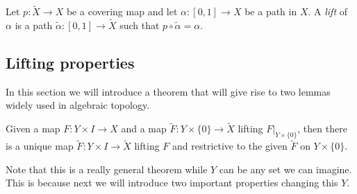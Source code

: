 \documentclass[12pt]{article}
\begin{document}
\begin{definition}
	Let \(p: \tilde{X} \rightarrow X\) be a covering map and let \(\alpha: [0,1] \rightarrow X\) be a path in \(X\). A \textit{lift} of \(\alpha\) is a path \(\tilde{\alpha}: [0,1] \rightarrow \tilde{X}\) such that \(p \circ \tilde{\alpha} = \alpha\).
\end{definition}

\subsection{Lifting properties}

In this section we will introduce a theorem that will give rise to two lemmas widely used in algebraic topology.

\begin{theorem}
	Given a map \(F : Y \times I \rightarrow X\) and a map \(\tilde{F} : Y \times \{0\} \rightarrow \tilde{X}\) lifting \(F|_{Y \times \{0\}}\), then there is a unique map \(\tilde{F} : Y \times I \rightarrow \tilde{X}\) lifting \(F\) and restrictive to the given \(\tilde{F}\) on \(Y \times \{0\}\). 
	\label{lemma:lift}
\end{theorem}

Note that this is a really general theorem while \(Y\) can be any set we can imagine. This is because next we will introduce two important properties changing this \(Y\).
\end{document}

